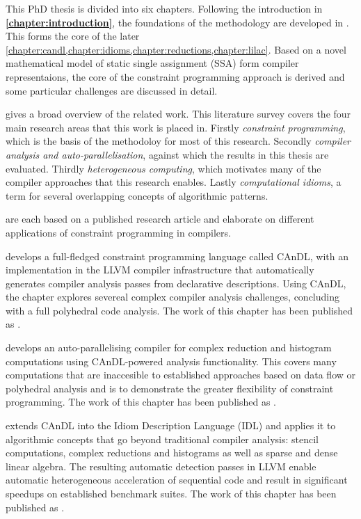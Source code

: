     This PhD thesis is divided into six chapters.
    Following the introduction in {\bf\cref{chapter:introduction}},
    the foundations of the methodology are developed in
    {\bf{}}.
    This forms the core of the later
    \cref{chapter:candl,chapter:idioms,chapter:reductions,chapter:lilac}.
    Based on a novel mathematical model of static single assignment (SSA) form
    compiler representaions, the core of the constraint programming approach
    is derived and some particular challenges are discussed in detail.

    {\bf{}} gives a broad overview of the related work.
    This literature survey covers the four main research areas that this work
    is placed in.
    Firstly {\em constraint programming}, which is the basis of the methodoloy
    for most of this research.
    Secondly {\em compiler analysis and auto-parallelisation}, against which the
    results in this thesis are evaluated.
    Thirdly {\em heterogeneous computing}, which motivates many of the compiler
    approaches that this research enables.
    Lastly {\em computational idioms}, a term for several overlapping concepts
    of algorithmic patterns.

    {\bf{}}
    are each based on a published research article and elaborate on different
    applications of constraint programming in compilers.

    {\bf{}} develops a full-fledged constraint programming
    language called CAnDL, with an implementation in the LLVM compiler
    infrastructure that automatically generates compiler analysis passes from
    declarative descriptions.
    Using CAnDL, the chapter explores severeal complex compiler analysis
    challenges, concluding with a full polyhedral code analysis.
    The work of this chapter has been published as
    {\bf\citet{Ginsbach:2018:CDS:3178372.3179515}}.

    {\bf{}} develops an auto-parallelising compiler for
    complex reduction and histogram computations using CAnDL-powered analysis
    functionality.
    This covers many computations that are inaccesible to established approaches
    based on data flow or polyhedral analysis and is to demonstrate the greater
    flexibility of constraint programming.
    The work of this chapter has been published as
    {\bf\citet{ginsbach2017discovery}}.

    {\bf{}} extends CAnDL into the Idiom Description Language
    (IDL) and applies it to algorithmic concepts that go beyond traditional
    compiler analysis: stencil computations, complex reductions and histograms
    as well as sparse and dense linear algebra.
    The resulting automatic detection passes in LLVM enable automatic
    heterogeneous acceleration of sequential code and result in significant
    speedups on established benchmark suites.
    The work of this chapter has been published as
    {\bf\citet{Ginsbach:2018:AML:3173162.3173182}}.


